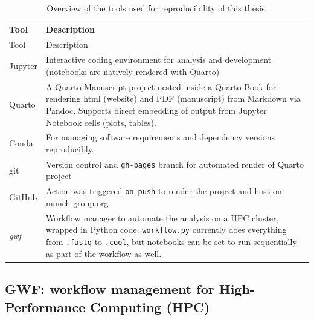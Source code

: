 \documentclass[
  11pt,
  a4paper,
]{scrbook}
\begin{document}
\begin{longtable}[]{@{}
  >{\raggedleft\arraybackslash}p{}
  >{\raggedright\arraybackslash}p{}@{}}
\caption{Overview of the tools used for reproducibility of this
thesis.}\label{tbl-reproducibility}\tabularnewline
\toprule\noalign{}
\begin{minipage}[b]{\linewidth}\raggedleft
Tool
\end{minipage} & \begin{minipage}[b]{\linewidth}\raggedright
Description
\end{minipage} \\
\midrule\noalign{}
\endfirsthead
\toprule\noalign{}
\begin{minipage}[b]{\linewidth}\raggedleft
Tool
\end{minipage} & \begin{minipage}[b]{\linewidth}\raggedright
Description
\end{minipage} \\
\midrule\noalign{}
\endhead
\bottomrule\noalign{}
\endlastfoot
Jupyter & Interactive coding environment for analysis and development
(notebooks are natively rendered with Quarto) \\
Quarto & A Quarto Manuscript project nested inside a Quarto Book for
rendering html (website) and PDF (manuscript) from Markdown via Pandoc.
Supports direct embedding of output from Jupyter Notebook cells (plots,
tables). \\
Conda & For managing software requirements and dependency versions
reproducibly. \\
git & Version control and \texttt{gh-pages} branch for automated render
of Quarto project \\
GitHub & Action was triggered \texttt{on\ push} to render the project
and host on
\href{https://munch-group.org/hic-spermatogenesis/}{munch-group.org} \\
\emph{gwf} & Workflow manager to automate the analysis on a HPC cluster,
wrapped in Python code. \texttt{workflow.py} currently does everything
from \texttt{.fastq} to \texttt{.cool}, but notebooks can be set to run
sequentially as part of the workflow as well. \\
\end{longtable}

\subsection{GWF: workflow management for High-Performance Computing
(HPC)}\label{gwf-workflow-management-for-high-performance-computing-hpc}
\end{document}
